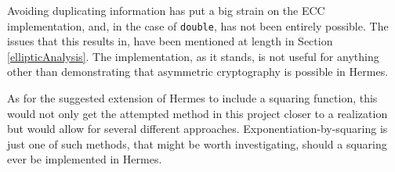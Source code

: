 Avoiding duplicating information has put a big strain on the ECC implementation, and, in the case of \texttt{double}, has not been entirely possible. The issues that this results in, have been mentioned at length in Section \ref{ellipticAnalysis}. The implementation, as it stands, is not useful for anything other than demonstrating that asymmetric cryptography is possible in Hermes. 

As for the suggested extension of Hermes to include a squaring function, this would not only get the attempted method in this project closer to a realization but would allow for several different approaches. Exponentiation-by-squaring is just one of such methods, that might be worth investigating, should a squaring ever be implemented in Hermes. 




